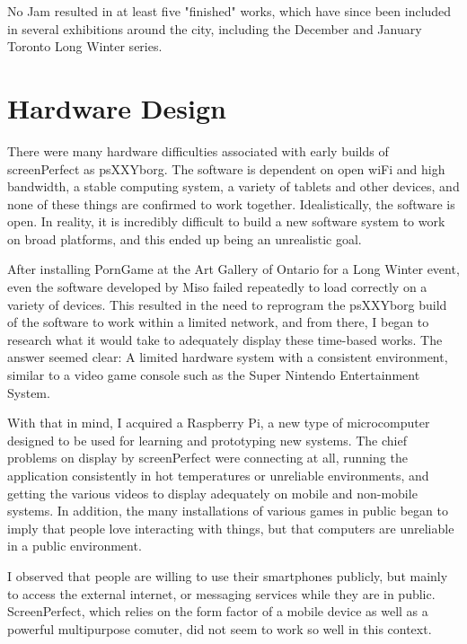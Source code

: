 No Jam resulted in at least five "finished" works, which have since been included in several exhibitions around the city, including the December and January Toronto Long Winter series.



\section{Hardware Design}

There were many hardware difficulties associated with early builds of screenPerfect as psXXYborg. The software is dependent on open wiFi and high bandwidth, a stable computing system, a variety of tablets and other devices, and none of these things are confirmed to work together. Idealistically, the software is open. In reality, it is incredibly difficult to build a new software system to work on broad platforms, and this ended up being an unrealistic goal.

After installing PornGame at the Art Gallery of Ontario for a Long Winter event, even the software developed by Miso failed repeatedly to load correctly on a variety of devices. This resulted in the need to reprogram the psXXYborg build of the software to work within a limited network, and from there, I began to research what it would take to adequately display these time-based works. The answer seemed clear: A limited hardware system with a consistent environment, similar to a video game console such as the Super Nintendo Entertainment System.

With that in mind, I acquired a Raspberry Pi, a new type of microcomputer designed to be used for learning and prototyping new systems. The chief problems on display by screenPerfect were connecting at all, running the application consistently in hot temperatures or unreliable environments, and getting the various videos to display adequately on mobile and non-mobile systems. In addition, the many installations of various games in public began to imply that people love interacting with things, but that computers are unreliable in a public environment.

I observed that people are willing to use their smartphones publicly, but mainly to access the external internet, or messaging services while they are in public. ScreenPerfect, which relies on the form factor of a mobile device as well as a powerful multipurpose comuter, did not seem to work so well in this context.

